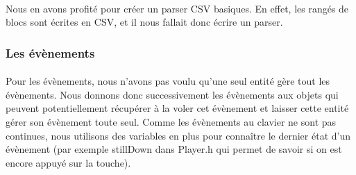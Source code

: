 \paragraph{} Nous en avons profité pour créer un parser CSV basiques. En effet, les rangés de blocs sont écrites en CSV, et il nous fallait donc écrire un parser.

\subsubsection{Les évènements}

\paragraph{} Pour les évènements, nous n'avons pas voulu qu'une seul entité gère tout les évènements. Nous donnons donc successivement les évènements aux objets qui peuvent potentiellement récupérer à la voler cet évènement et laisser cette entité gérer son évènement toute seul. Comme les évènements au clavier ne sont pas continues, nous utilisons des variables en plus pour connaître le dernier état d'un évènement (par exemple stillDown dans Player.h qui permet de savoir si on est encore appuyé sur la touche).
